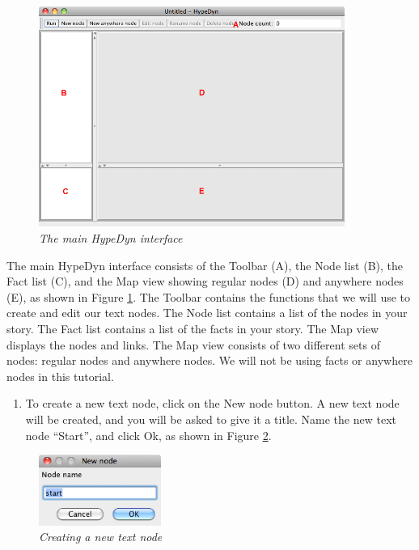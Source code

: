 \documentclass{article}
\begin{document}
\begin{figure}[ht]
  \centering
  \includegraphics[width=10cm]{images/hypedyn-tutorial-1-figure-2}
  \caption{\textit{The main HypeDyn interface}}
  \label{fig:hypedyn}
\end{figure} 

The main HypeDyn interface consists of the Toolbar (A), the Node list (B), the
Fact list (C), and the Map view showing regular nodes (D) and anywhere nodes (E),
as shown in Figure \ref{fig:hypedyn}. The Toolbar contains the functions that we
will use to create and edit our text nodes. The Node list contains a list of the
nodes in your story. The Fact list contains a list of the facts in your story.
The Map view displays the nodes and links. The Map view consists of two different
sets of nodes: regular nodes and anywhere nodes. We will not be using facts or
anywhere nodes in this tutorial.

\begin{enumerate}
  \item To create a new text node, click on the New node button. A new text node
  will be created, and you will be asked to give it a title. Name the new text
  node ``Start'', and click Ok, as shown in Figure \ref{fig:new_node}.
\end{enumerate}

 
\begin{figure}[ht]
  \centering
  \includegraphics[width=4cm]{images/hypedyn-tutorial-1-figure-3}
  \caption{\textit{Creating a new text node}}
  \label{fig:new_node}
\end{figure} 
\end{document}
